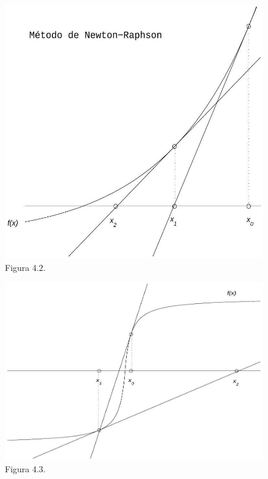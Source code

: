 \documentclass[10pt]{article}
\begin{document}
\begin{figure}[h]
\begin{center}
  \includegraphics[width=\textwidth]{2025_09_05_3888c9ac96bd653d96b4g-074(1)}
\captionsetup{labelformat=empty}
\caption{Figura 4.2.}
\end{center}
\end{figure}

\begin{figure}[h]
\begin{center}
  \includegraphics[width=\textwidth]{2025_09_05_3888c9ac96bd653d96b4g-074}
\captionsetup{labelformat=empty}
\caption{Figura 4.3.}
\end{center}
\end{figure}
\end{document}
